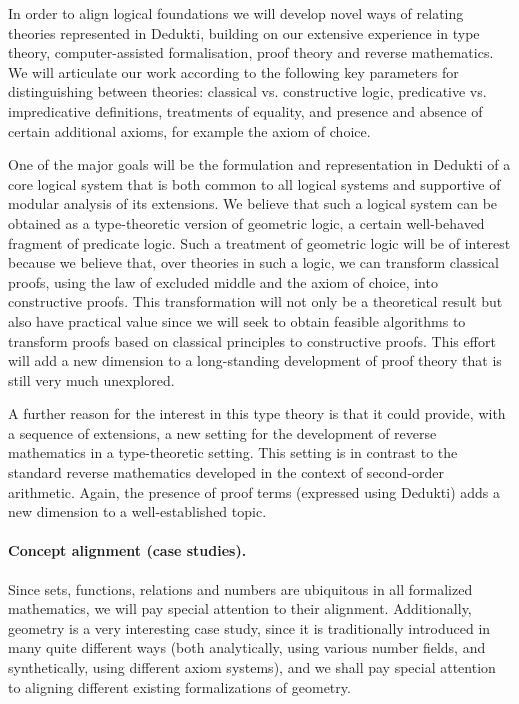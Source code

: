 In order to align logical foundations we will develop novel ways of
relating theories represented in Dedukti, building on our extensive
experience in type theory, computer-assisted formalisation, proof
theory and reverse mathematics. We will articulate our work according
to the following key parameters for distinguishing between theories:
classical vs. constructive logic, predicative vs. impredicative
definitions, treatments of equality, and presence and absence of
certain additional axioms, for example the axiom of choice.

One of the major goals will be the formulation and representation in
Dedukti of a core logical system that is both common to all logical
systems and supportive of modular analysis of its extensions. We
believe that such a logical system can be obtained as a type-theoretic
version of geometric logic, a certain well-behaved fragment of
predicate logic. Such a treatment of geometric logic will be of
interest because we believe that, over theories in such a logic, we
can transform classical proofs, using the law of excluded middle and
the axiom of choice, into constructive proofs.  This transformation
will not only be a theoretical result but also have practical value
since we will seek to obtain feasible algorithms to transform proofs
based on classical principles to constructive proofs.  This effort
will add a new dimension to a long-standing development of proof
theory that is still very much unexplored.

A further reason for the interest in this type theory is that it could
provide, with a sequence of extensions, a new setting for the
development of reverse mathematics in a type-theoretic setting. This
setting is in contrast to the standard reverse mathematics developed
in the context of second-order arithmetic. Again, the presence of
proof terms (expressed using Dedukti) adds a new dimension to a
well-established topic.

\paragraph*{Concept alignment (case studies).}
Since sets, functions, relations and numbers are ubiquitous in all
formalized mathematics, we will pay special attention to their
alignment. Additionally, geometry is a very interesting case study,
since it is traditionally introduced in many quite different ways
(both analytically, using various number fields, and synthetically,
using different axiom systems), and we shall pay special attention to
aligning different existing formalizations of geometry.

